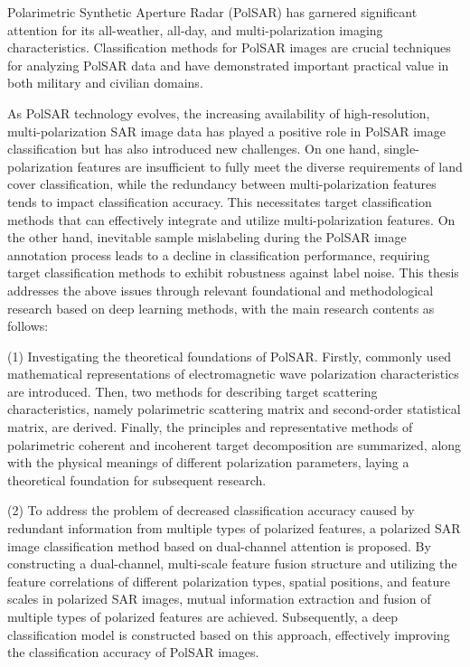 
\begin{englishabstract}
    Polarimetric Synthetic Aperture Radar (PolSAR) has garnered significant attention for its all-weather, all-day, and multi-polarization imaging characteristics. Classification methods for PolSAR images are crucial techniques for analyzing PolSAR data and have demonstrated important practical value in both military and civilian domains.

    As PolSAR technology evolves, the increasing availability of high-resolution, multi-polarization SAR image data has played a positive role in PolSAR image classification but has also introduced new challenges. On one hand, single-polarization features are insufficient to fully meet the diverse requirements of land cover classification, while the redundancy between multi-polarization features tends to impact classification accuracy. This necessitates target classification methods that can effectively integrate and utilize multi-polarization features. On the other hand, inevitable sample mislabeling during the PolSAR image annotation process leads to a decline in classification performance, requiring target classification methods to exhibit robustness against label noise. This thesis addresses the above issues through relevant foundational and methodological research based on deep learning methods, with the main research contents as follows:

    (1) Investigating the theoretical foundations of PolSAR. Firstly, commonly used mathematical representations of electromagnetic wave polarization characteristics are introduced. Then, two methods for describing target scattering characteristics, namely polarimetric scattering matrix and second-order statistical matrix, are derived. Finally, the principles and representative methods of polarimetric coherent and incoherent target decomposition are summarized, along with the physical meanings of different polarization parameters, laying a theoretical foundation for subsequent research.

    (2) To address the problem of decreased classification accuracy caused by redundant information from multiple types of polarized features, a polarized SAR image classification method based on dual-channel attention is proposed. By constructing a dual-channel, multi-scale feature fusion structure and utilizing the feature correlations of different polarization types, spatial positions, and feature scales in polarized SAR images, mutual information extraction and fusion of multiple types of polarized features are achieved. Subsequently, a deep classification model is constructed based on this approach, effectively improving the classification accuracy of PolSAR images.


\end{englishabstract}
